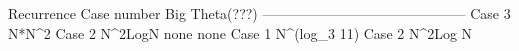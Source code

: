 Recurrence    Case number     Big Theta(???)
--------------------------------------------
              Case 3          N*N^2
              Case 2          N^2LogN
              none            none
              Case 1          N^(log_3 11)
              Case 2          N^2Log N
